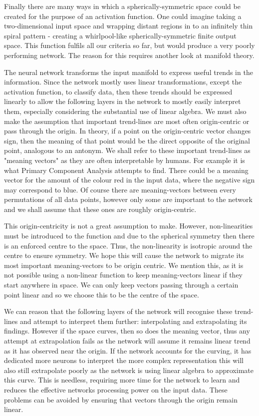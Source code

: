 \documentclass[onecolumn]{article}
\begin{document}
    Finally there are many ways in which a spherically-symmetric space could be created for the purpose of an activation function. One could imagine taking a two-dimensional input space and wrapping distant regions in to an infinitely thin spiral pattern - creating a whirlpool-like spherically-symmetric finite output space. This function fulfils all our criteria so far, but would produce a very poorly performing network. The reason for this requires another look at manifold theory.

    The neural network transforms the input manifold to express useful trends in the information. Since the network mostly uses linear transformations, except the activation function, to classify data, then these trends should be expressed linearly to allow the following layers in the network to mostly easily interpret them, especially considering the substantial use of linear algebra. We must also make the assumption that important trend-lines are most often origin-centric or pass through the origin. In theory, if a point on the origin-centric vector changes sign, then the meaning of that point would be the direct opposite of the original point, analogous to an antonym. We shall refer to these important trend-lines as "meaning vectors" as they are often interpretable by humans. For example it is what Primary Component Analysis attempts to find. There could be a meaning vector for the amount of the colour red in the input data, where the negative sign may correspond to blue. Of course there are meaning-vectors between every permutations of all data points, however only some are important to the network and we shall assume that these ones are roughly origin-centric.

    This origin-centricity is not a great assumption to make. However, non-linearities must be introduced to the function and due to the spherical symmetry then there is an enforced centre to the space. Thus, the non-linearity is isotropic around the centre to ensure symmetry. We hope this will cause the network to migrate its most important meaning-vectors to be origin centric. We mention this, as it is not possible using a non-linear function to keep meaning-vectors linear if they start anywhere in space. We can only keep vectors passing through a certain point linear and so we choose this to be the centre of the space.

    We can reason that the following layers of the network will recognise these trend-lines and attempt to interpret them further: interpolating and extrapolating its findings. However if the space curves, then so does the meaning vector, thus any attempt at extrapolation fails as the network will assume it remains linear trend as it has observed near the origin. If the network accounts for the curving, it has dedicated more neurons to interpret the more complex representation this will also still extrapolate poorly as the network is using linear algebra to approximate this curve. This is needless, requiring more time for the network to learn and reduces the effective networks processing power on the input data. These problems can be avoided by ensuring that vectors through the origin remain linear. 
        
\end{document}

